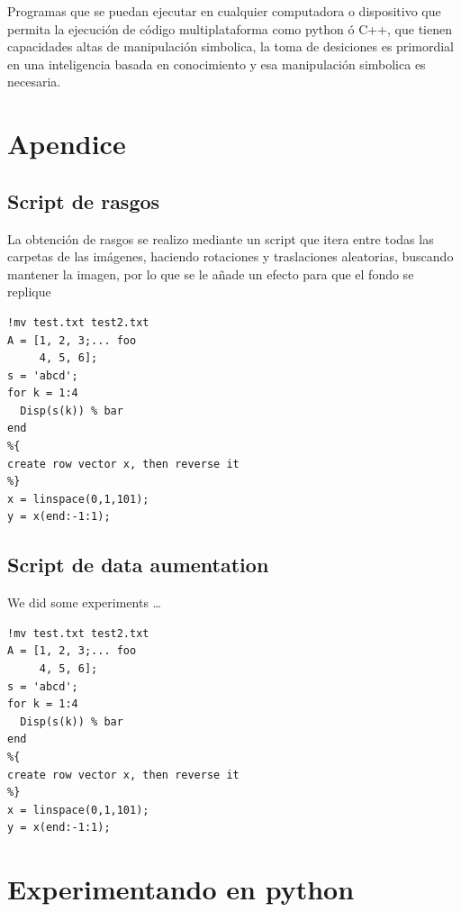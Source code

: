 \documentclass[a4paper, 11pt]{article}
\begin{document}
Programas que se puedan ejecutar en cualquier computadora o dispositivo que permita la ejecución de código multiplataforma como python ó C++, que tienen capacidades altas de manipulación simbolica, la toma de desiciones es primordial en una inteligencia basada en conocimiento y esa manipulación simbolica es necesaria.

\section{Apendice}

\subsection{Script de rasgos}

La obtención de rasgos se realizo mediante un script que itera entre todas las carpetas de las imágenes, haciendo rotaciones y traslaciones aleatorias, buscando mantener la imagen, por lo que se le añade un efecto para que el fondo se replique


\begin{lstlisting}[style=Matlab-editor, caption=Script de rasgos]
%% Sample Matlab code
!mv test.txt test2.txt
A = [1, 2, 3;... foo
     4, 5, 6];
s = 'abcd';
for k = 1:4
  Disp(s(k)) % bar
end
%{
create row vector x, then reverse it
%}
x = linspace(0,1,101);
y = x(end:-1:1);
\end{lstlisting}


\subsection{Script de data aumentation}

We did some experiments \ldots

\begin{lstlisting}[style=Matlab-editor, caption=Python example]
%% Sample Matlab code
!mv test.txt test2.txt
A = [1, 2, 3;... foo
     4, 5, 6];
s = 'abcd';
for k = 1:4
  Disp(s(k)) % bar
end
%{
create row vector x, then reverse it
%}
x = linspace(0,1,101);
y = x(end:-1:1);
\end{lstlisting}

\pagebreak

\section{Experimentando en python}
\end{document}
